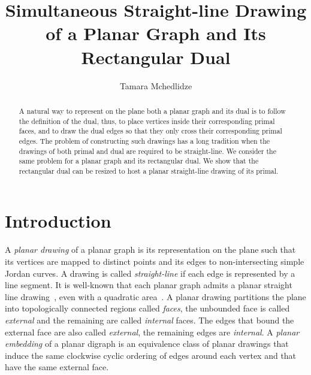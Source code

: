 \documentclass{llncs}
\title{Simultaneous Straight-line Drawing of a Planar Graph and Its Rectangular Dual }
\author{
Tamara  Mchedlidze}
\institute{Faculty of Informatics, Karlsruhe
Institute of Technology (KIT), Germany \texttt{mched@iti.uka.de}}
\begin{document}
\maketitle

\begin{abstract}
A natural way to represent on the plane both a planar graph and its dual is to follow the definition of the dual, thus, to place vertices inside their corresponding primal faces, and to draw the dual edges so that they only cross their corresponding primal edges. The problem of constructing such drawings has a long tradition when the drawings of both primal and dual are required to be straight-line. We consider the same problem for a planar graph and its rectangular dual.  We show that the rectangular dual can be resized to host a planar straight-line drawing of its primal.  
\end{abstract}

\section{Introduction}


A \emph{planar drawing} of a planar graph is its representation  on the plane such that its vertices  are mapped to distinct points and its edges to non-intersecting simple Jordan curves. A drawing is called \emph{straight-line} if each edge is represented by a line segment.  It is well-known that each planar graph admits a planar straight line drawing~\cite{Fary48},  even with a quadratic area~\cite{DFPP90,Schnyd90}.
A planar drawing  partitions the plane into topologically connected regions called \emph{faces}, the unbounded face is called \emph{external} and the remaining are called \emph{internal} faces. The edges  that bound the external face are also called \emph{external}, the remaining edges are \emph{internal}.  A \emph{planar embedding} of a planar digraph  is an equivalence class of planar drawings that induce the same clockwise cyclic ordering of edges around each vertex and that have the same external face. 
 
\end{document}
